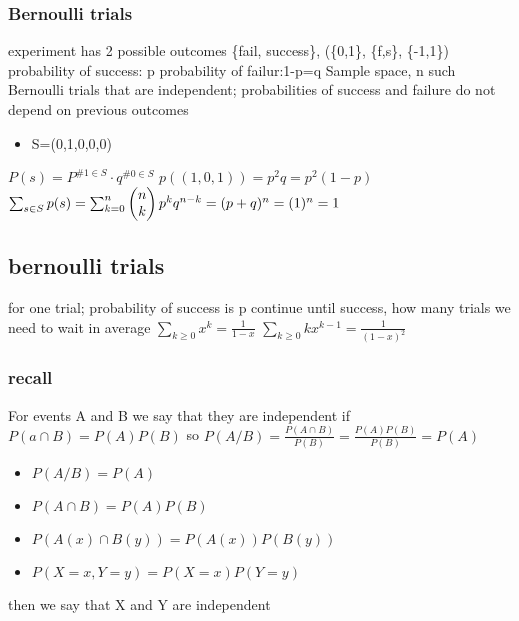 \documentclass[a4paper,10pt]{article}
\begin{document}
\subsubsection{Bernoulli trials}
experiment has 2 possible outcomes
\newline
\{fail, success\}, (\{0,1\}, \{f,s\}, \{-1,1\})
\newline
probability of success: p
\newline
probability of failur:1-p=q
\newline
Sample space, n such Bernoulli trials that are independent; probabilities  of success and failure do not depend on previous outcomes
\begin{itemize}
 \item S=(0,1,0,0,0)
\end{itemize}
$P(s)=P^{\#1\in S}\cdot q^{\#0\in S}$
\newline
$p((1,0,1))=p^2q=p^2(1-p)$
\newline
$\sum_{s\in S}p(s)=\sum_{k=0}^n\begin{pmatrix}
                                n\cr
                                k\cr
                               \end{pmatrix}
p^kq^{n-k}=(p+q)^n=(1)^n=1$
\subsection{bernoulli trials}
for one trial; probability of success is p continue until success, how many trials we need to wait in average
\newline
$\sum_{k\geq 0}x^k=\frac{1}{1-x}$
\newline
$\sum_{k\geq 0}kx^{k-1}=\frac{1}{(1-x)^2}$

\subsubsection{recall}
For events A and B we say that they are independent if $P(a\cap B)=P(A)P(B)$
\newline
so $P(A/B)=\frac{P(A\cap B)}{P(B)}=\frac{P(A)P(B)}{P(B)}=P(A)$
\begin{itemize}
 \item $P(A/B)=P(A)$
 \item $P(A\cap B)=P(A)P(B)$
 \item $P(A(x)\cap B(y))=P(A(x))P(B(y))$
 \item $P(X=x,Y=y)=P(X=x)P(Y=y)$
\end{itemize}
then we say that X and Y are independent 
\end{document}
